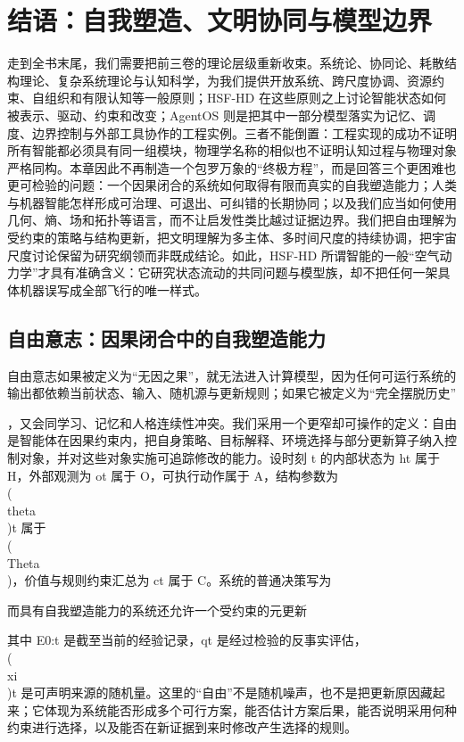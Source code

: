 \chapter{结语：自我塑造、文明协同与模型边界}

\label{chp:conclusion}

走到全书末尾，我们需要把前三卷的理论层级重新收束。系统论、协同论、耗散结构理论、复杂系统理论与认知科学，为我们提供开放系统、跨尺度协调、资源约束、自组织和有限认知等一般原则；HSF-HD 在这些原则之上讨论智能状态如何被表示、驱动、约束和改变；AgentOS 则是把其中一部分模型落实为记忆、调度、边界控制与外部工具协作的工程实例。三者不能倒置：工程实现的成功不证明所有智能都必须具有同一组模块，物理学名称的相似也不证明认知过程与物理对象严格同构。本章因此不再制造一个包罗万象的“终极方程”，而是回答三个更困难也更可检验的问题：一个因果闭合的系统如何取得有限而真实的自我塑造能力；人类与机器智能怎样形成可治理、可退出、可纠错的长期协同；以及我们应当如何使用几何、熵、场和拓扑等语言，而不让启发性类比越过证据边界。我们把自由理解为受约束的策略与结构更新，把文明理解为多主体、多时间尺度的持续协调，把宇宙尺度讨论保留为研究纲领而非既成结论。如此，HSF-HD 所谓智能的一般“空气动力学”才具有准确含义：它研究状态流动的共同问题与模型族，却不把任何一架具体机器误写成全部飞行的唯一样式。

\section{自由意志：因果闭合中的自我塑造能力}

\label{sec:section_9208}

自由意志如果被定义为“无因之果”，就无法进入计算模型，因为任何可运行系统的输出都依赖当前状态、输入、随机源与更新规则；如果它被定义为“完全摆脱历史”

，又会同学习、记忆和人格连续性冲突。我们采用一个更窄却可操作的定义：自由是智能体在因果约束内，把自身策略、目标解释、环境选择与部分更新算子纳入控制对象，并对这些对象实施可追踪修改的能力。设时刻 t 的内部状态为 ht 属于 H，外部观测为 ot 属于 O，可执行动作属于 A，结构参数为 \\(\\theta\\)t 属于 \\(\\Theta\\)，价值与规则约束汇总为 ct 属于 C。系统的普通决策写为

而具有自我塑造能力的系统还允许一个受约束的元更新

其中 E0:t 是截至当前的经验记录，qt 是经过检验的反事实评估，\\(\\xi\\)t 是可声明来源的随机量。这里的“自由”不是随机噪声，也不是把更新原因藏起来；它体现为系统能否形成多个可行方案，能否估计方案后果，能否说明采用何种约束进行选择，以及能否在新证据到来时修改产生选择的规则。

